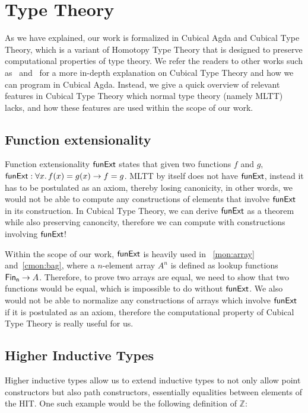 \section{Type Theory}
\label{sec:type-theory}
As we have explained, our work is formalized in Cubical Agda and Cubical Type Theory,
which is a variant of Homotopy Type Theory that is designed to preserve
computational properties of type theory.
We refer the readers to other works such as~\cite{vezzosiCubicalAgdaDependently2019}
and~\cite{cohenCubicalTypeTheory2018} for a more in-depth explanation on Cubical Type Theory
and how we can program in Cubical Agda. Instead, we give a quick overview of relevant features
in Cubical Type Theory which normal type theory (namely MLTT) lacks, and how these features
are used within the scope of our work.

\subsection{Function extensionality}
Function extensionality $\operatorname{\mathsf{funExt}}$ states that given two functions $f$ and $g$,
$\operatorname{\mathsf{funExt}}: \forall x.\,f(x) = g(x) \to f = g$. MLTT by itself does not have $\operatorname{\mathsf{funExt}}$,
instead it has to be postulated as an axiom, thereby losing canonicity, in other words,
we would not be able to compute any constructions of elements that involve $\operatorname{\mathsf{funExt}}$
in its construction. In Cubical Type Theory, we can derive $\operatorname{\mathsf{funExt}}$
as a theorem while also preserving canoncity, therefore we can compute with constructions
involving $\operatorname{\mathsf{funExt}}$!

Within the scope of our work, $\operatorname{\mathsf{funExt}}$ is heavily used in
~\ref{mon:array} and~\ref{cmon:bag}, where a $n$-element array $A^n$ is defined as lookup functions
$\Fin[n] \to A$. Therefore, to prove two arrays are equal, we need to show that two functions would be
equal, which is impossible to do without $\operatorname{\mathsf{funExt}}$. We also would not be able to normalize
any constructions of arrays which involve $\operatorname{\mathsf{funExt}}$ if it is postulated as an axiom, therefore
the computational property of Cubical Type Theory is really useful for us.

\subsection{Higher Inductive Types}
Higher inductive types allow us to extend inductive types to not only allow point constructors
but also path constructors, essentially equalities between elements of the HIT. One such example
would be the following definition of $\mathbb{Z}$:

